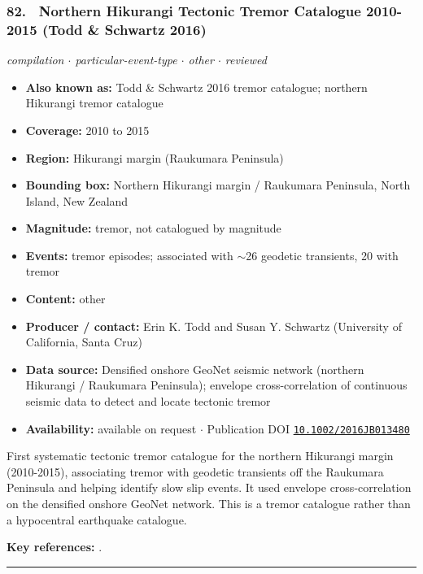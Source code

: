 \documentclass[10pt,a4paper]{article}
\newcommand{\catentryrule}{\par\vspace{3pt}\noindent\textcolor{rulegrey}{\rule{\linewidth}{0.3pt}}\par\vspace{5pt}}
\newcommand{\kv}[2]{\item \textbf{#1:} #2}
\begin{document}
\subsubsection*{\hypertarget{c:82}{82.}~ Northern Hikurangi Tectonic Tremor Catalogue 2010-2015 (Todd \& Schwartz 2016)}
{\small\itshape compilation $\cdot$ particular-event-type $\cdot$ other $\cdot$ reviewed}\par\vspace{2pt}
\begin{itemize}[leftmargin=1.3em,itemsep=0.6pt,topsep=1pt,parsep=0pt]
\kv{Also known as}{Todd \& Schwartz 2016 tremor catalogue; northern Hikurangi tremor catalogue}
\kv{Coverage}{2010 to 2015}
\kv{Region}{Hikurangi margin (Raukumara Peninsula)}
\kv{Bounding box}{Northern Hikurangi margin / Raukumara Peninsula, North Island, New Zealand}
\kv{Magnitude}{tremor, not catalogued by magnitude}
\kv{Events}{tremor episodes; associated with $\sim$26 geodetic transients, 20 with tremor}
\kv{Content}{other}
\kv{Producer / contact}{Erin K. Todd and Susan Y. Schwartz (University of California, Santa Cruz)}
\kv{Data source}{Densified onshore GeoNet seismic network (northern Hikurangi / Raukumara Peninsula); envelope cross-correlation of continuous seismic data to detect and locate tectonic tremor}
\kv{Availability}{available on request $\cdot$ Publication DOI \href{https://doi.org/10.1002/2016JB013480}{\nolinkurl{10.1002/2016JB013480}}}
\end{itemize}
\par\vspace{2pt}First systematic tectonic tremor catalogue for the northern Hikurangi margin (2010-2015), associating tremor with geodetic transients off the Raukumara Peninsula and helping identify slow slip events. It used envelope cross-correlation on the densified onshore GeoNet network. This is a tremor catalogue rather than a hypocentral earthquake catalogue.
\par\vspace{2pt}\textbf{Key references:} \cite{Todd2016}.
\catentryrule
\end{document}
